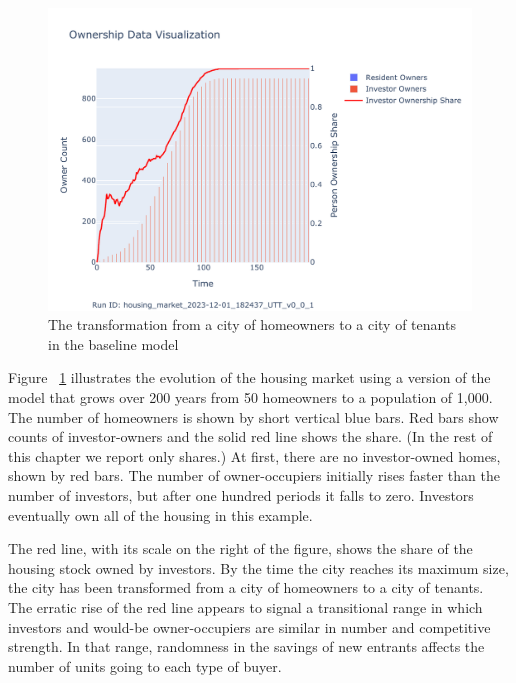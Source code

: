 \begin{figure}[h!tb]
    \centering
    \hspace{4cm} %
    \includegraphics[scale=0.8, trim={0 1cm 0 1.8cm}, clip]{fig/Analysis/Ownership_Data_1.pdf}
    \caption{The transformation from a city of homeowners to a city of tenants in the baseline model}
    \label{fig:Baseline_ownership_trajectory}
\end{figure}


Figure ~\ref{fig:Baseline_ownership_trajectory} illustrates the evolution of the housing market using a version of the model that grows over 200 years from 50 homeowners to a population of 1,000. The number of homeowners is shown by short vertical blue bars.  Red bars show counts of investor-owners and the solid red line shows the share. (In the rest of this chapter we report only shares.) 
 At first, there are no investor-owned homes, shown by red bars. The number of owner-occupiers initially rises faster than the number of investors, but after one hundred periods it falls to zero. Investors eventually own all of the housing in this example. 
 
 The red line, with its scale on the right of the figure, shows the share of the housing stock owned by investors. By the time the city reaches its maximum size, the city has been transformed from a city of homeowners to a city of tenants. The erratic rise of the red line appears to signal a transitional range in which investors and would-be owner-occupiers are similar in number and competitive strength. In that range, randomness in the savings of new entrants affects the number of units going to each type of buyer.

